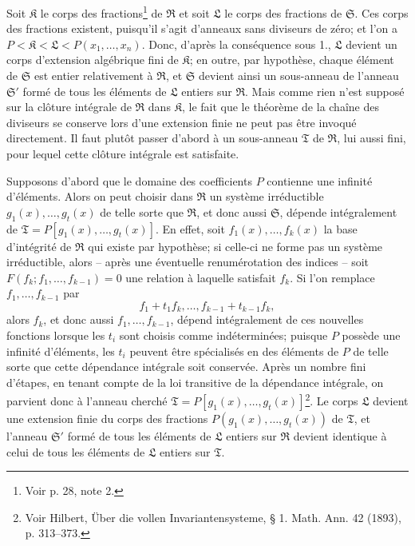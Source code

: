 Soit $\mathfrak K$ le corps des fractions\footnote{Voir p. 28, note 2.} de $\mathfrak R$ et soit $\mathfrak L$ le corps des fractions de $\mathfrak S$. Ces corps des fractions existent, puisqu'il s'agit d'anneaux sans diviseurs de zéro; et l'on a $P<\mathfrak K<\mathfrak L<P(x_1,\ldots,x_n)$. Donc, d'après la conséquence sous 1., $\mathfrak L$ devient un corps d'extension algébrique fini de $\mathfrak K$; en outre, par hypothèse, chaque élément de $\mathfrak S$ est entier relativement à $\mathfrak R$, et $\mathfrak S$ devient ainsi un sous-anneau de l'anneau $\mathfrak S'$ formé de tous les éléments de $\mathfrak L$ entiers sur $\mathfrak R$. Mais comme rien n'est supposé sur la clôture intégrale de $\mathfrak R$ dans $\mathfrak K$, le fait que le théorème de la chaîne des diviseurs se conserve lors d'une extension finie ne peut pas être invoqué directement. Il faut plutôt passer d'abord à un sous-anneau $\mathfrak T$ de $\mathfrak R$, lui aussi fini, pour lequel cette clôture intégrale est satisfaite.

Supposons d'abord que le domaine des coefficients $P$ contienne une infinité d'éléments. Alors on peut choisir dans $\mathfrak R$ un système irréductible $g_1(x),\ldots,g_t(x)$ de telle sorte que $\mathfrak R$, et donc aussi $\mathfrak S$, dépende intégralement de $\mathfrak T=P[g_1(x),\ldots,g_t(x)]$. En effet, soit $f_1(x),\ldots,f_k(x)$ la base d'intégrité de $\mathfrak R$ qui existe par hypothèse; si celle-ci ne forme pas un système irréductible, alors -- après une éventuelle renumérotation des indices -- soit $F(f_k;f_1,\ldots,f_{k-1})=0$ une relation à laquelle satisfait $f_k$. Si l'on remplace $f_1,\ldots,f_{k-1}$ par
\[
 f_1+t_1f_k,\ldots,f_{k-1}+t_{k-1}f_k,
\]
alors $f_k$, et donc aussi $f_1,\ldots,f_{k-1}$, dépend intégralement de ces nouvelles fonctions lorsque les $t_i$ sont choisis comme indéterminées; puisque $P$ possède une infinité d'éléments, les $t_i$ peuvent être spécialisés en des éléments de $P$ de telle sorte que cette dépendance intégrale soit conservée. Après un nombre fini d'étapes, en tenant compte de la loi transitive de la dépendance intégrale, on parvient donc à l'anneau cherché $\mathfrak T=P[g_1(x),\ldots,g_t(x)]$\footnote{Voir Hilbert, Über die vollen Invariantensysteme, \S{} 1. Math. Ann. 42 (1893), p. 313--373.}. Le corps $\mathfrak L$ devient une extension finie du corps des fractions $P(g_1(x),\ldots,g_t(x))$ de $\mathfrak T$, et l'anneau $\mathfrak S'$ formé de tous les éléments de $\mathfrak L$ entiers sur $\mathfrak R$ devient identique à celui de tous les éléments de $\mathfrak L$ entiers sur $\mathfrak T$.

